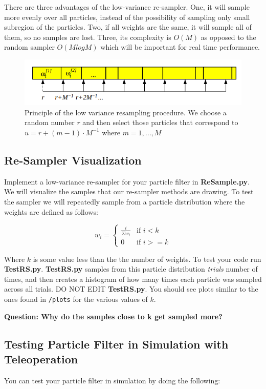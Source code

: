 \documentclass[final]{article}
\newcommand{\code}[1]{\texttt{#1}}
\begin{document}
There are three advantages of the low-variance re-sampler. One, it will sample more evenly over all particles, instead of the possibility of sampling only small subregion of the particles. Two, if all weights are the same, it will sample all of them, so no samples are lost. Three, its complexity is \(O(M)\) as opposed to the random sampler \(O(MlogM)\) which will be important for real time performance.

\begin{figure}
    \centering
    \includegraphics[width=0.8\linewidth]{figs/resample.png}
    \caption{Principle of the low variance resampling procedure. We choose a random number \(r\) and then select those particles that correspond to \(u = r + (m - 1) \cdot M^{-1}\) where \(m = 1, . . . , M\)}
    \label{fig:resample}
\end{figure}

\subsection{Re-Sampler Visualization}
Implement a low-variance re-sampler for your particle filter in \textbf{ReSample.py}. We will visualize the samples that our re-sampler methods are drawing. To test the sampler we will repeatedly sample from a particle distribution where the weights are defined as follows:

\[
	w_i = 
	\begin{cases}
	\frac{i}{\Sigma w_i} & \text{if } i < k\\
	0 & \text{if } i >= k
	\end{cases}
\]

Where $k$ is some value less than the the number of weights. To test your code run \textbf{TestRS.py}. \textbf{TestRS.py} samples from this particle distribution \textit{trials} number of times, and then creates a histogram of how many times each particle was sampled across all trials. DO NOT EDIT \textbf{TestRS.py}. You should see plots similar to the ones found in \code{/plots} for the various values of \(k\).

\textbf{Question: Why do the samples close to k get sampled more?}

\subsection{Testing Particle Filter in Simulation with Teleoperation}
\label{sec:test_pf_sim_teleop}
You can test your particle filter in simulation by doing the following:
\end{document}

